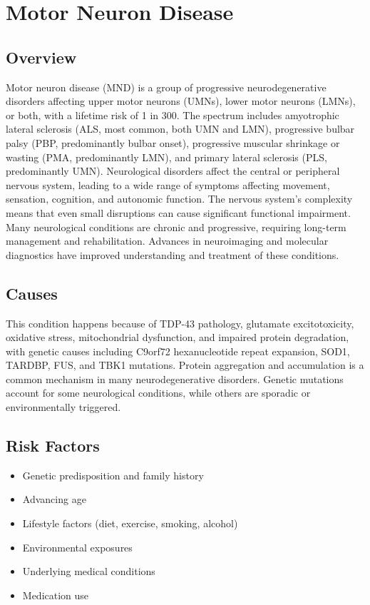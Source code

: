 \chapter{Motor Neuron Disease}
\label{sec:Motor Neuron Disease}

\section{Overview}
Motor neuron disease (MND) is a group of progressive neurodegenerative disorders affecting upper motor neurons (UMNs), lower motor neurons (LMNs), or both, with a lifetime risk of 1 in 300. The spectrum includes amyotrophic lateral sclerosis (ALS, most common, both UMN and LMN), progressive bulbar palsy (PBP, predominantly bulbar onset), progressive muscular shrinkage or wasting (PMA, predominantly LMN), and primary lateral sclerosis (PLS, predominantly UMN). Neurological disorders affect the central or peripheral nervous system, leading to a wide range of symptoms affecting movement, sensation, cognition, and autonomic function. The nervous system's complexity means that even small disruptions can cause significant functional impairment. Many neurological conditions are chronic and progressive, requiring long-term management and rehabilitation. Advances in neuroimaging and molecular diagnostics have improved understanding and treatment of these conditions.
\section{Causes}
This condition happens because of TDP-43 pathology, glutamate excitotoxicity, oxidative stress, mitochondrial dysfunction, and impaired protein degradation, with genetic causes including C9orf72 hexanucleotide repeat expansion, SOD1, TARDBP, FUS, and TBK1 mutations.   Protein aggregation and accumulation is a common mechanism in many neurodegenerative disorders.  Genetic mutations account for some neurological conditions, while others are sporadic or environmentally triggered.   
\section{Risk Factors}
\begin{itemize}[noitemsep]
  \item Genetic predisposition and family history
  \item Advancing age
  \item Lifestyle factors (diet, exercise, smoking, alcohol)
  \item Environmental exposures
  \item Underlying medical conditions
  \item Medication use
\end{itemize}

